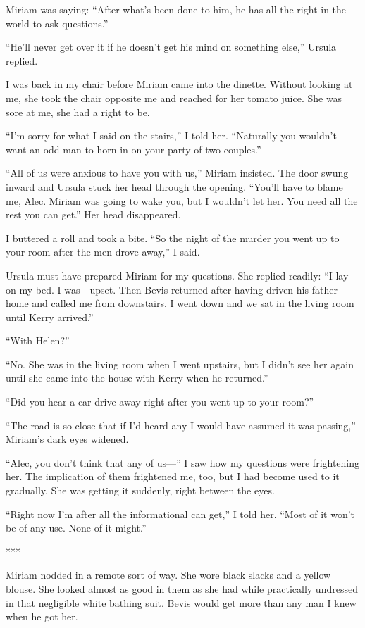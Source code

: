 \documentclass{novel}
\begin{document}
{Miriam was saying: “After what’s been done to him, he has all the right in the world to ask questions.”

“He’ll never get over it if he doesn’t get his mind on something else,” Ursula replied.

I was back in my chair before Miriam came into the dinette. Without looking at me, she took the chair opposite me and reached for her tomato juice. She was sore at me, she had a right to be.

“I’m sorry for what I said on the stairs,” I told her. “Naturally you wouldn’t want an odd man to horn in on your party of two couples.”

“All of us were anxious to have you with us,” Miriam insisted. The door swung inward and Ursula stuck her head through the opening. “You’ll have to blame me, Alec. Miriam was going to wake you, but I wouldn’t let her. You need all the rest you can get.” Her head disappeared.

I buttered a roll and took a bite. “So the night of the murder you went up to your room after the men drove away,” I said.

Ursula must have prepared Miriam for my questions. She replied readily: “I lay on my bed. I was—upset. Then Bevis returned after having driven his father home and called me from downstairs. I went down and we sat in the living room until Kerry arrived.”

“With Helen?”

“No. She was in the living room when I went upstairs, but I didn’t see her again until she came into the house with Kerry when he returned.”

“Did you hear a car drive away right after you went up to your room?”

“The road is so close that if I’d heard any I would have assumed it was passing,” Miriam’s dark eyes widened.

“Alec, you don’t think that any of us—” I saw how my questions were frightening her. The implication of them frightened me, too, but I had become used to it gradually. She was getting it suddenly, right between the eyes.

“Right now I’m after all the informational can get,” I told her. “Most of it won’t be of any use. None of it might.”

***

Miriam nodded in a remote sort of way. She wore black slacks and a yellow blouse. She looked almost as good in them as she had while practically undressed in that negligible white bathing suit. Bevis would get more than any man I knew when he got her.

}
\end{document}
